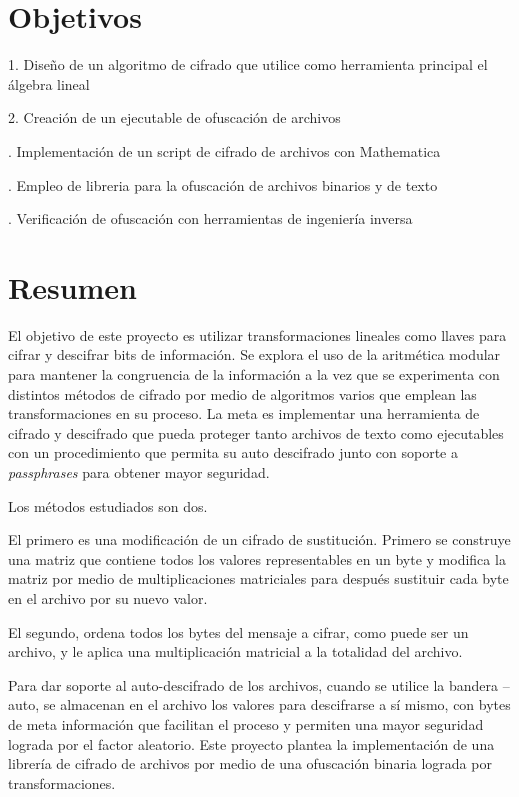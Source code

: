 \documentclass[a4paper]{article}
\begin{document}
\vfill

\newpage
\tableofcontents

\newpage
\section{Objetivos}

1. Diseño de un algoritmo de cifrado que utilice como herramienta principal el
álgebra lineal

2. Creación de un ejecutable de ofuscación de archivos

. Implementación de un script de cifrado de archivos con Mathematica

. Empleo de libreria para la ofuscación de archivos binarios y de
texto

. Verificación de ofuscación con herramientas de ingeniería inversa

\section{Resumen}

El objetivo de este proyecto es utilizar transformaciones lineales como llaves
para cifrar y descifrar bits de información.
Se explora el uso de la aritmética modular para mantener la congruencia de la
información
 a la vez que se experimenta con distintos métodos de cifrado por medio de
algoritmos varios que emplean las transformaciones en su proceso.
La meta es implementar una herramienta de cifrado y descifrado que pueda
proteger tanto archivos de texto como ejecutables con un procedimiento
que permita su auto descifrado junto con soporte a \textit{passphrases} para
obtener mayor seguridad.

Los métodos estudiados son dos. 

El primero es una modificación de un cifrado de sustitución. Primero se
construye una matriz que contiene todos los valores representables en un 
byte y modifica la matriz por medio de multiplicaciones matriciales para
después sustituir cada byte en el archivo por su nuevo valor. 

El segundo, ordena todos los bytes del mensaje a cifrar, como puede ser un
archivo, y le aplica una multiplicación matricial a la totalidad del archivo. 

Para dar soporte al auto-descifrado de los archivos, cuando se utilice la
bandera --auto, se almacenan en el archivo los valores para descifrarse a sí
mismo, 
con bytes de meta información que facilitan el proceso y permiten una mayor
seguridad lograda por el factor aleatorio. Este proyecto plantea la
implementación 
de una librería de cifrado de archivos por medio de una ofuscación binaria
lograda por transformaciones.
\end{document}
